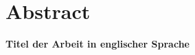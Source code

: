 \chapter{Abstract} \label{vor:abstract}

\textsf{\Large \bfseries Titel der Arbeit in englischer Sprache}

\lipsum[1-2]
